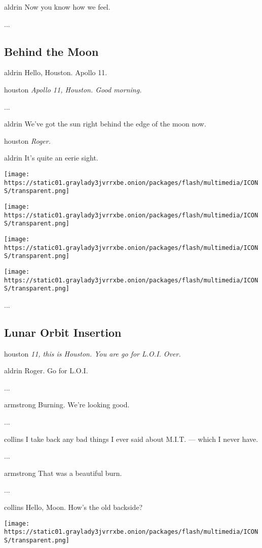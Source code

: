 aldrin Now you know how we feel.

...

\hypertarget{-behind-the-moon-}{%
\subsection{ Behind the Moon }\label{-behind-the-moon-}}

aldrin Hello, Houston. Apollo 11.

houston \emph{Apollo 11, Houston. Good morning.}

...

aldrin We've got the sun right behind the edge of the moon now.

houston \emph{Roger.}

aldrin It's quite an eerie sight.

\texttt{[image: https://static01.graylady3jvrrxbe.onion/packages/flash/multimedia/ICONS/transparent.png]}

\texttt{[image: https://static01.graylady3jvrrxbe.onion/packages/flash/multimedia/ICONS/transparent.png]}

\texttt{[image: https://static01.graylady3jvrrxbe.onion/packages/flash/multimedia/ICONS/transparent.png]}

\texttt{[image: https://static01.graylady3jvrrxbe.onion/packages/flash/multimedia/ICONS/transparent.png]}

...

\hypertarget{-lunar-orbit-insertion-}{%
\subsection{ Lunar Orbit Insertion }\label{-lunar-orbit-insertion-}}

houston \emph{11, this is Houston. You are go for L.O.I. Over.}

aldrin Roger. Go for L.O.I.

...

armstrong Burning. We're looking good.

...

collins I take back any bad things I ever said about M.I.T. --- which I
never have.

...

armstrong That was a beautiful burn.

...

collins Hello, Moon. How's the old backside?

\texttt{[image: https://static01.graylady3jvrrxbe.onion/packages/flash/multimedia/ICONS/transparent.png]}


